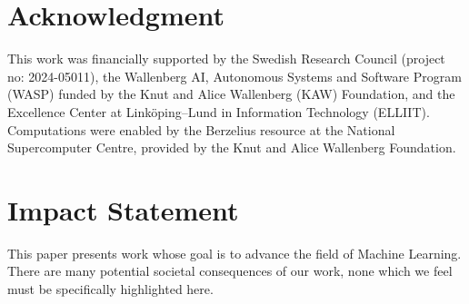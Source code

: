\documentclass{article}
\theoremstyle{plain}
\theoremstyle{definition}
\theoremstyle{remark}
\begin{document}
\begin{abstract}
    We introduce a guided stochastic sampling method that augments sampling from diffusion models with physics-based guidance derived from partial differential equation (PDE) residuals and observational constraints, ensuring generated samples remain physically admissible. We embed this sampling procedure within a new Sequential Monte Carlo (SMC) framework, yielding a scalable generative PDE solver. Across multiple benchmark PDE systems as well as multiphysics and interacting PDE systems, our method produces solution fields with lower numerical error than existing state-of-the-art generative methods. 
\end{abstract}






\section*{Acknowledgment}
This work was financially supported by the Swedish Research Council (project no: 2024-05011), the Wallenberg AI, Autonomous Systems and Software Program (WASP) funded by the Knut and Alice Wallenberg (KAW) Foundation, and the Excellence Center at Linköping--Lund in Information Technology (ELLIIT). 
Computations were enabled by the Berzelius resource at the National Supercomputer Centre, provided by the  Knut and Alice Wallenberg Foundation.

\section*{Impact Statement}
This paper presents work whose goal is to advance the field of Machine Learning. There are many potential societal consequences of our work, none which we feel must be specifically highlighted here.




\newpage
\appendix
\onecolumn

\end{document}

